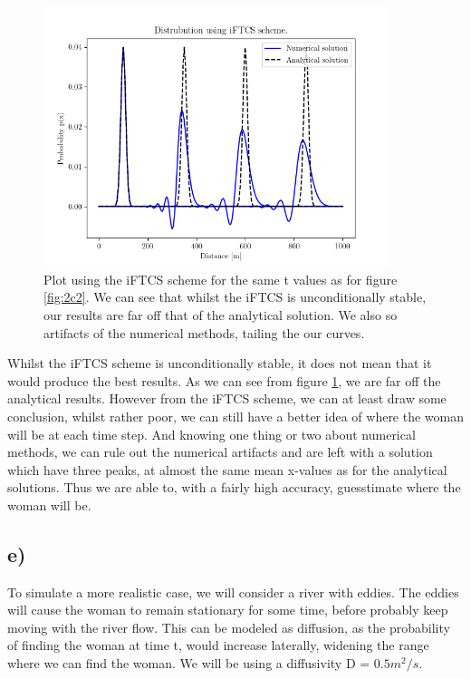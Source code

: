 \documentclass[10pt, a4paper]{amsart}
\begin{document}
\begin{figure}
	\centering
	\includegraphics[width=0.9\textwidth]{../code/2d.png}
	\caption{Plot using the iFTCS scheme for the same t values as for figure \ref{fig:2c2}. We can see that whilst the iFTCS is unconditionally stable, our results are far off that of the analytical solution. We also so artifacts of the numerical methods, tailing the our curves.}
	\label{fig:2d}
\end{figure}
Whilst the iFTCS scheme is unconditionally stable\cite{bookA}, it does not mean that it would produce the best results. As we can see from figure \ref{fig:2d}, we are far off the analytical results. However from the iFTCS scheme, we can at least draw some conclusion, whilst rather poor, we can still have a better idea of where the woman will be at each time step. And knowing one thing or two about numerical methods, we can rule out the numerical artifacts and are left with a solution which have three peaks, at almost the same mean x-values as for the analytical solutions. Thus we are able to, with a fairly high accuracy, guesstimate where the woman will be.

\subsection{e)}
To simulate a more realistic case, we will consider a river with eddies. The eddies will cause the woman to remain stationary for some time, before probably keep moving with the river flow. This can be modeled as diffusion, as the probability of finding the woman at time t, would increase laterally, widening the range where we can find the woman. We will be using a diffusivity D = $0.5 m^2/s$.
\end{document}
